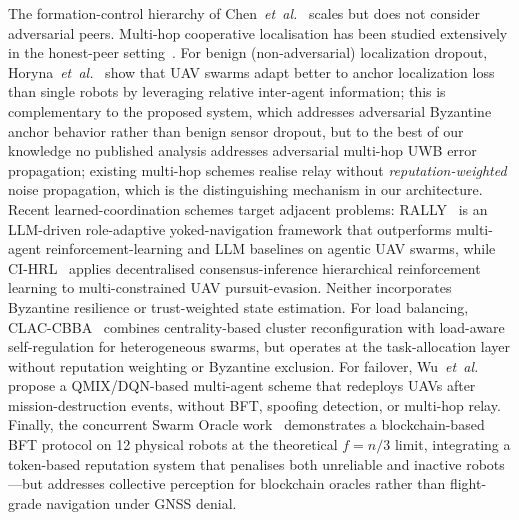 \documentclass[conference,10pt]{IEEEtran}
\begin{document}
The formation-control hierarchy of Chen~\emph{et~al.}~\cite{wang2020groupbased} scales but does not consider adversarial peers. Multi-hop cooperative localisation has been studied extensively in the honest-peer setting~\cite{guo2017cooperative,wan2014dnbp}. For benign (non-adversarial) localization dropout, Horyna~\emph{et~al.}~\cite{horyna2025swa} show that UAV swarms adapt better to anchor localization loss than single robots by leveraging relative inter-agent information; this is complementary to the proposed system, which addresses adversarial Byzantine anchor behavior rather than benign sensor dropout, but to the best of our knowledge no published analysis addresses adversarial multi-hop UWB error propagation; existing multi-hop schemes realise relay without \emph{reputation-weighted} noise propagation, which is the distinguishing mechanism in our architecture. Recent learned-coordination schemes target adjacent problems: RALLY~\cite{wang2025rally} is an LLM-driven role-adaptive yoked-navigation framework that outperforms multi-agent reinforcement-learning and LLM baselines on agentic UAV swarms, while CI-HRL~\cite{xiang2025cihrl} applies decentralised consensus-inference hierarchical reinforcement learning to multi-constrained UAV pursuit-evasion. Neither incorporates Byzantine resilience or trust-weighted state estimation. For load balancing, CLAC-CBBA~\cite{gan2026clac} combines centrality-based cluster reconfiguration with load-aware self-regulation for heterogeneous swarms, but operates at the task-allocation layer without reputation weighting or Byzantine exclusion. For failover, Wu~\emph{et~al.}~\cite{wu2023redeployment} propose a QMIX/DQN-based multi-agent scheme that redeploys UAVs after mission-destruction events, without BFT, spoofing detection, or multi-hop relay. Finally, the concurrent Swarm Oracle work~\cite{pacheco2025swarmoracle} demonstrates a blockchain-based BFT protocol on 12 physical robots at the theoretical $f{=}n/3$ limit, integrating a token-based reputation system that penalises both unreliable and inactive robots---but addresses collective perception for blockchain oracles rather than flight-grade navigation under GNSS denial.
\end{document}

